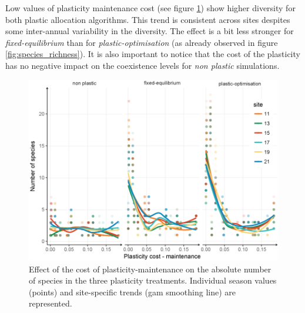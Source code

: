 

Low values of plasticity maintenance cost (see figure \ref{fig:pl_cost}) show higher diversity for both plastic allocation algorithms. This trend is consistent across sites despites some inter-annual variability in the diversity. The effect is a bit less stronger for \textit{fixed-equilibrium} than for \textit{plastic-optimisation} (as already observed in figure \ref{fig:species_richness}). It is also important to notice that the cost of the plasticity has no negative impact on the coexistence levels for \textit{non plastic} simulations.

\begin{figure}%
    \includegraphics[width=1\linewidth]{./2_PP/Figures/Comm/comm_n_sp_pc_m_edit.png}%
  \caption[Maintenance plasticity cost effect on species richness]{Effect of the cost of plasticity-maintenance on the absolute number of species in the three plasticity treatments. Individual season values (points) and site-specific trends (gam smoothing line) are represented. }
  \label{fig:pl_cost}
\end{figure}



